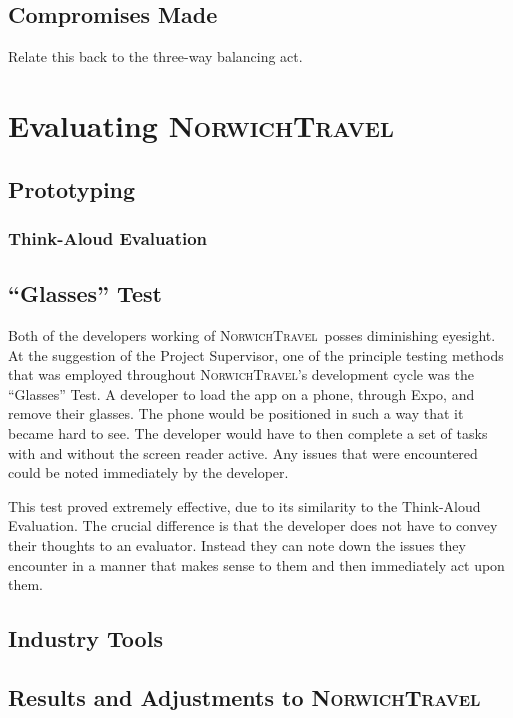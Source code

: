 \documentclass[cmpstyle]{ueacmpstyle}
\newcommand{\nt}{\textsc{NorwichTravel}}
\begin{document}
		\subsection{Compromises Made} \label{sec:comp}
		Relate this back to the three-way balancing act.
		
	\section{Evaluating \nt} \label{sec:eval}
	
		\subsection{Prototyping} \label{sec:proto}
		
			\subsubsection{Think-Aloud Evaluation} \label{sec:think}
			
		\subsection{``Glasses'' Test} \label{sec:glasses}
		Both of the developers working of \nt \ posses diminishing eyesight. At the suggestion of the Project Supervisor, one of the principle testing methods that was employed throughout \nt's development cycle was the ``Glasses'' Test. A developer to load the app on a phone, through Expo, and remove their glasses. The phone would be positioned in such a way that it became hard to see. The developer would have to then complete a set of tasks with and without the screen reader active. Any issues that were encountered could be noted immediately by the developer. 
		
		This test proved extremely effective, due to its similarity to the Think-Aloud Evaluation. The crucial difference is that the developer does not have to convey their thoughts to an evaluator. Instead they can note down the issues they encounter in a manner that makes sense to them and then immediately act upon them. 
		
		\subsection{Industry Tools} \label{sec:industry-tools}
		
		\subsection{Results and Adjustments to \nt} \label{sec:adjust}
			
\end{document}
